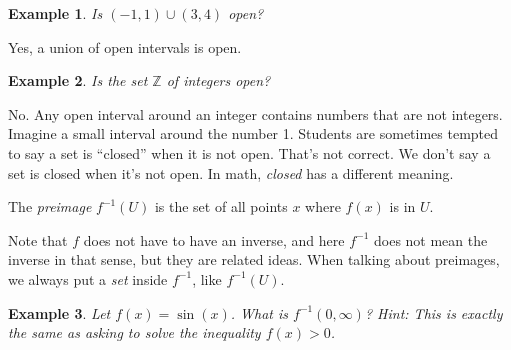 \documentclass[11pt]{book}
\newenvironment{definition}[1][Definition]{\begin{trivlist}
\item[\hskip \labelsep {\bfseries #1}]}{\end{trivlist}}
\newtheorem{example}{Example}
\numberwithin{example}{chapter}
\begin{document}
\begin{example}
Is $(-1,1)\cup (3,4)$ open?  
\end{example}

Yes, a union of open intervals is open.

\begin{example}
Is the set $\mathbb{Z}$ of integers open?
\end{example}

No.  Any open interval around an integer contains numbers that are not integers.  Imagine a small interval around the number 1.  Students are sometimes tempted to say a set is ``closed'' when it is not open.  That's not correct.  We don't say a set is closed when it's not open.  In math, \emph{closed} has a different meaning.  


\begin{definition}
The \emph{preimage} $f^{-1}(U)$ is the set of all points $x$ where $f(x)$ is in $U$.
\end{definition}


Note that $f$ does not have to have an inverse, and here $f^{-1}$ does not mean the inverse in that sense, but they are related ideas.  When talking about preimages, we always put a \emph{set} inside $f^{-1}$, like $f^{-1}(U)$.

\begin{example}
Let $f(x)=\sin(x)$.  What is $f^{-1}(0,\infty)$?  Hint: This is exactly the same as asking to solve the inequality $f(x) >0$.
\end{example}


\begin{center}
\end{center}
\end{document}
